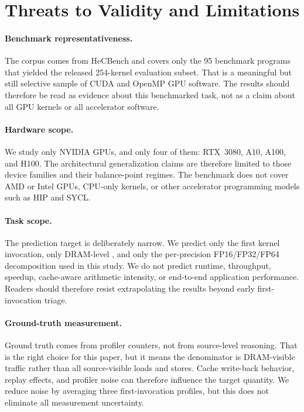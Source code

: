 \section{Threats to Validity and Limitations}
\label{sec:threats}

\paragraph{Benchmark representativeness.}
The corpus comes from HeCBench and covers only the 95 benchmark programs that yielded the released 254-kernel evaluation subset.
That is a meaningful but still selective sample of CUDA and OpenMP GPU software.
The results should therefore be read as evidence about this benchmarked task, not as a claim about all GPU kernels or all accelerator software.

\paragraph{Hardware scope.}
We study only NVIDIA GPUs, and only four of them: RTX~3080, A10, A100, and H100.
The architectural generalization claims are therefore limited to those device families and their balance-point regimes.
The benchmark does not cover AMD or Intel GPUs, CPU-only kernels, or other accelerator programming models such as HIP and SYCL.

\paragraph{Task scope.}
The prediction target is deliberately narrow.
We predict only the first kernel invocation, only DRAM-level \rai, and only the per-precision FP16/FP32/FP64 decomposition used in this study.
We do not predict runtime, throughput, speedup, cache-aware arithmetic intensity, or end-to-end application performance.
Readers should therefore resist extrapolating the results beyond early first-invocation triage.

\paragraph{Ground-truth measurement.}
Ground truth comes from profiler counters, not from source-level reasoning.
That is the right choice for this paper, but it means the denominator is DRAM-visible traffic rather than all source-visible loads and stores.
Cache write-back behavior, replay effects, and profiler noise can therefore influence the target quantity.
We reduce noise by averaging three first-invocation profiles, but this does not eliminate all measurement uncertainty.

